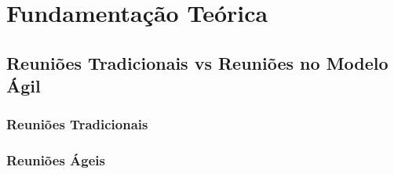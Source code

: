 \chapter[Fundamentação Teórica]{Fundamentação Teórica}
\label{cp:fundamentacao}

\section{Reuniões Tradicionais vs Reuniões no Modelo Ágil}

\subsection{Reuniões Tradicionais}

\subsection{Reuniões Ágeis}





